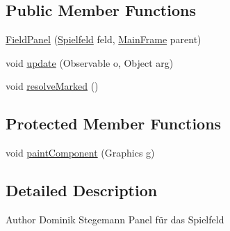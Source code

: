 \subsection*{Public Member Functions}
\begin{DoxyCompactItemize}
\item 
\hyperlink{classde_1_1gameoflife_1_1gui_1_1FieldPanel_a25102c102574eedee9f07061db54f545}{Field\-Panel} (\hyperlink{classde_1_1gameoflife_1_1models_1_1Spielfeld}{Spielfeld} feld, \hyperlink{classde_1_1gameoflife_1_1gui_1_1MainFrame}{Main\-Frame} parent)
\item 
void \hyperlink{classde_1_1gameoflife_1_1gui_1_1FieldPanel_a076bf3328371cff17937009b6a0055c4}{update} (Observable o, Object arg)
\item 
void \hyperlink{classde_1_1gameoflife_1_1gui_1_1FieldPanel_ac3960e50f23c172f3d4526662a51f832}{resolve\-Marked} ()
\end{DoxyCompactItemize}
\subsection*{Protected Member Functions}
\begin{DoxyCompactItemize}
\item 
void \hyperlink{classde_1_1gameoflife_1_1gui_1_1FieldPanel_ae45bb13c83f28bab84af7c0bd6b7d423}{paint\-Component} (Graphics g)
\end{DoxyCompactItemize}


\subsection{Detailed Description}
\begin{DoxyAuthor}{Author}
Dominik Stegemann Panel für das Spielfeld 
\end{DoxyAuthor}


